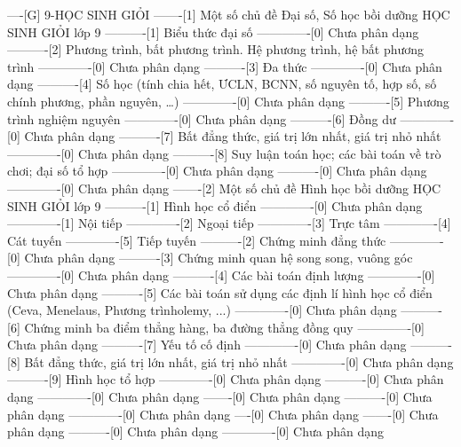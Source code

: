 ----[G] 9-HỌC SINH GIỎI
-------[1] Một số chủ đề Đại số, Số học bồi dưỡng HỌC SINH GIỎI lớp 9
----------[1] Biểu thức đại số
-------------[0] Chưa phân dạng
----------[2] Phương trình, bất phương trình. Hệ phương trình, hệ bất phương trình
-------------[0] Chưa phân dạng
----------[3] Đa thức
-------------[0] Chưa phân dạng
----------[4] Số học (tính chia hết, ƯCLN, BCNN, số nguyên tố, hợp số, số chính phương, phần nguyên, \ldots)
-------------[0] Chưa phân dạng
----------[5] Phương trình nghiệm nguyên
-------------[0] Chưa phân dạng
----------[6] Đồng dư
-------------[0] Chưa phân dạng
----------[7] Bất đẳng thức, giá trị lớn nhất, giá trị nhỏ nhất
-------------[0] Chưa phân dạng
----------[8] Suy luận toán học; các bài toán về trò chơi; đại số tổ hợp
-------------[0] Chưa phân dạng
----------[0] Chưa phân dạng
-------------[0] Chưa phân dạng
-------[2] Một số chủ đề Hình học bồi dưỡng HỌC SINH GIỎI lớp 9
----------[1] Hình học cổ điển
-------------[0] Chưa phân dạng
-------------[1] Nội tiếp
-------------[2] Ngoại tiếp
-------------[3] Trực tâm
-------------[4] Cát tuyến
-------------[5] Tiếp tuyến
----------[2] Chứng minh đẳng thức
-------------[0] Chưa phân dạng
----------[3] Chứng minh quan hệ song song, vuông góc
-------------[0] Chưa phân dạng
----------[4] Các bài toán định lượng
-------------[0] Chưa phân dạng
----------[5] Các bài toán sử dụng các định lí hình học cổ điển (Ceva, Menelaus, Phương trìnholemy, ...)
-------------[0] Chưa phân dạng
----------[6] Chứng minh ba điểm thẳng hàng, ba đường thẳng đồng quy
-------------[0] Chưa phân dạng
----------[7] Yếu tố cố định
-------------[0] Chưa phân dạng
----------[8] Bất đẳng thức, giá trị lớn nhất, giá trị nhỏ nhất
-------------[0] Chưa phân dạng
----------[9] Hình học tổ hợp
-------------[0] Chưa phân dạng
----------[0] Chưa phân dạng
-------------[0] Chưa phân dạng
-------[0] Chưa phân dạng
----------[0] Chưa phân dạng
-------------[0] Chưa phân dạng
----[0] Chưa phân dạng
-------[0] Chưa phân dạng
----------[0] Chưa phân dạng
-------------[0] Chưa phân dạng
